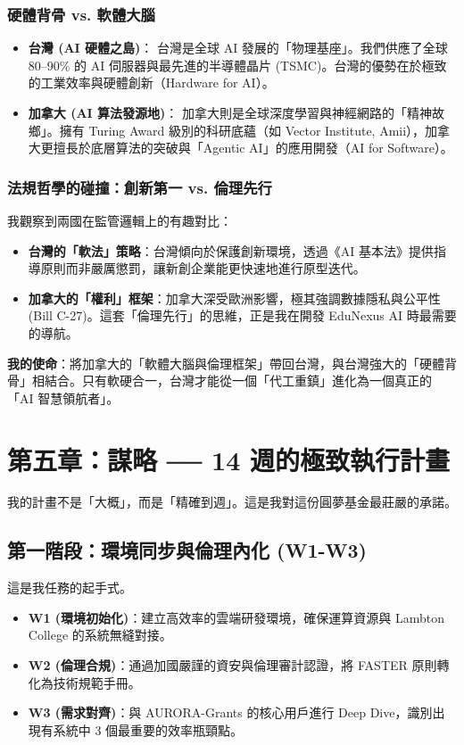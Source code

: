 \documentclass[12pt,a4paper]{article}
\begin{document}
\subsubsection{硬體背骨 vs. 軟體大腦}
\begin{itemize}
    \item \textbf{台灣 (AI 硬體之島)}：
    台灣是全球 AI 發展的「物理基座」。我們供應了全球 80--90\% 的 AI 伺服器與最先進的半導體晶片 (TSMC)。台灣的優勢在於極致的工業效率與硬體創新（Hardware for AI）。
    \item \textbf{加拿大 (AI 算法發源地)}：
    加拿大則是全球深度學習與神經網路的「精神故鄉」。擁有 Turing Award 級別的科研底蘊（如 Vector Institute, Amii），加拿大更擅長於底層算法的突破與「Agentic AI」的應用開發（AI for Software）。
\end{itemize}

\subsubsection{法規哲學的碰撞：創新第一 vs. 倫理先行}
我觀察到兩國在監管邏輯上的有趣對比：
\begin{itemize}
    \item \textbf{台灣的「軟法」策略}：台灣傾向於保護創新環境，透過《AI 基本法》提供指導原則而非嚴厲懲罰，讓新創企業能更快速地進行原型迭代。
    \item \textbf{加拿大的「權利」框架}：加拿大深受歐洲影響，極其強調數據隱私與公平性 (Bill C-27)。這套「倫理先行」的思維，正是我在開發 EduNexus AI 時最需要的導航。
\end{itemize}

\textbf{我的使命}：將加拿大的「軟體大腦與倫理框架」帶回台灣，與台灣強大的「硬體背骨」相結合。只有軟硬合一，台灣才能從一個「代工重鎮」進化為一個真正的「AI 智慧領航者」。

\newpage

\section{第五章：謀略 ── 14 週的極致執行計畫}

我的計畫不是「大概」，而是「精確到週」。這是我對這份圓夢基金最莊嚴的承諾。

\subsection{第一階段：環境同步與倫理內化 (W1-W3)}
這是我任務的起手式。
\begin{itemize}
    \item \textbf{W1 (環境初始化)}：建立高效率的雲端研發環境，確保運算資源與 Lambton College 的系統無縫對接。
    \item \textbf{W2 (倫理合規)}：通過加國嚴謹的資安與倫理審計認證，將 FASTER 原則轉化為技術規範手冊。
    \item \textbf{W3 (需求對齊)}：與 AURORA-Grants 的核心用戶進行 Deep Dive，識別出現有系統中 3 個最重要的效率瓶頸點。
\end{itemize}
\end{document}
